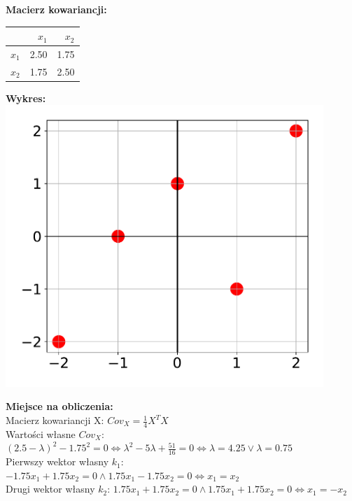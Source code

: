 \documentclass[a4paper,11pt]{article}
\newcommand{\myHeaderCellColor}{\cellcolor{black!10}}
\newcommand{\emptybox}[2][\textwidth]{%
	\begingroup
	\setlength{\fboxsep}{-\fboxrule}%
	\noindent\framebox[#1]{\rule{0pt}{#2}}%
	\endgroup
}
\begin{document}
%
\begin{minipage}[t]{0.3\textwidth}
\noindent\textbf{Macierz kowariancji:}\medskip\\
\begin{tabular}{l|r|r|}
\hhline{|~|-|-|}
& $x_1$\myHeaderCellColor & $x_2$\myHeaderCellColor\\\hline
\multicolumn{1}{|l|}{$x_1$\myHeaderCellColor} & 2.50 & 1.75 \\\hline
\multicolumn{1}{|l|}{$x_2$\myHeaderCellColor} & 1.75 & 2.50 \\\hline
\end{tabular}
\end{minipage}
%
\begin{minipage}[t]{0.45\textwidth}
	\noindent\textbf{Wykres:}\\\vspace{-0.1cm}
	\hspace{-0.85cm}\includegraphics[width=0.9\textwidth]{img/chart_pca_clear_x.pdf}
\end{minipage}



\noindent\textbf{Miejsce na obliczenia:}\medskip\\
Macierz kowariancji X: $Cov_{X} = \frac{1}{4}X^{T}X$ \vspace{0.2cm} \\
Wartości własne $Cov_{X}$: $(2.5 - \lambda)^2 - 1.75^2 = 0 \iff \lambda^2 - 5\lambda + \frac{51}{16}=0 \iff
\lambda = 4.25 \lor \lambda =0.75$ \vspace{0.2cm} \\
Pierwszy wektor własny $k_1$: $-1.75x_1 + 1.75x_2 = 0 \land 1.75x_1 - 1.75x_2 = 0 \iff x_1=x_2$ \vspace{0.2cm} \\
Drugi wektor własny $k_2$: $1.75x_1 + 1.75x_2 = 0 \land 1.75x_1 + 1.75x_2 = 0 \iff x_1=-x_2$ 
\end{document}

